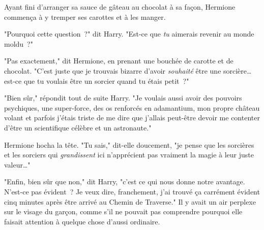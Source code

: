 Ayant fini d'arranger sa sauce de gâteau au chocolat à sa façon, Hermione commença à y tremper ses carottes et à les manger.

"Pourquoi cette question~?" dit Harry. "Est-ce que \emph{tu} aimerais revenir au monde moldu~?"

"Pas exactement," dit Hermione, en prenant une bouchée de carotte et de chocolat. "C'est juste que je trouvais bizarre d'avoir \emph{souhaité} être une sorcière… est-ce que tu voulais être un sorcier quand tu étais petit~?"

"Bien sûr," répondit tout de suite Harry. "Je voulais aussi avoir des pouvoirs psychiques, une super-force, des os renforcés en adamantium, mon propre château volant et parfois j'étais triste de me dire que j'allais peut-être devoir me contenter d'être un scientifique célèbre et un astronaute."

Hermione hocha la tête. "Tu sais," dit-elle doucement, "je pense que les sorcières et les sorciers qui \emph{grandissent} ici n'apprécient pas vraiment la magie à leur juste valeur…"

"Enfin, bien sûr que non," dit Harry, "c'est ce qui nous donne notre avantage. N'est-ce pas évident~? Je veux dire, franchement, j'ai trouvé ça carrément évident cinq minutes après être arrivé au Chemin de Traverse." Il y avait un air perplexe sur le visage du garçon, comme s'il ne pouvait pas comprendre pourquoi elle faisait attention à quelque chose d'aussi ordinaire. 

